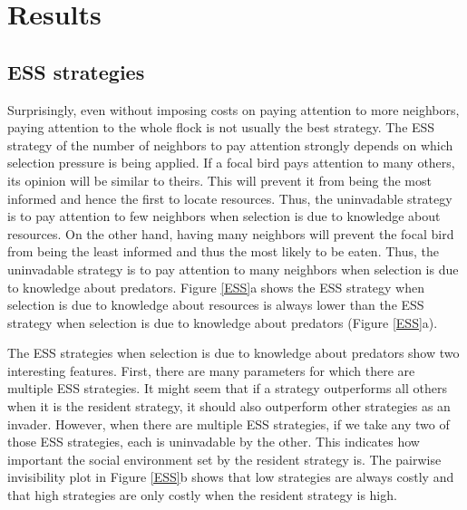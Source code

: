 \documentclass{article}
\begin{document}
\section{Results }

\subsection{ESS strategies }
Surprisingly, even without imposing costs on paying attention to more neighbors, paying attention to the whole flock is not usually the best strategy. The ESS strategy of the number of neighbors to pay attention strongly depends on which selection pressure is being applied.  If a focal bird pays attention to many others, its opinion will be similar to theirs. This will prevent it from being the most informed and hence the first to locate resources. Thus, the uninvadable strategy is to pay attention to few neighbors when selection is due to knowledge about resources. On the other hand, having many neighbors will prevent the focal bird from being the least informed and thus the most likely to be eaten.  Thus, the uninvadable strategy is to pay attention to many neighbors when selection is due to knowledge about predators. Figure \ref{ESS}a shows the ESS strategy when selection is due to knowledge about resources is always lower than the ESS strategy when selection is due to knowledge about predators (Figure \ref{ESS}a).

The ESS strategies when selection is due to knowledge about predators show two interesting features. First, there are many parameters for which there are multiple ESS strategies. It might seem that if a strategy outperforms all others when it is the resident strategy, it should also outperform other strategies as an invader. However, when there are multiple ESS strategies, if we take any two of those ESS strategies, each is uninvadable by the other. This indicates how important the social environment set by the resident strategy is. The pairwise invisibility plot in Figure \ref{ESS}b shows that low strategies are always costly and that high strategies are only costly when the resident strategy is high. 
\end{document}

